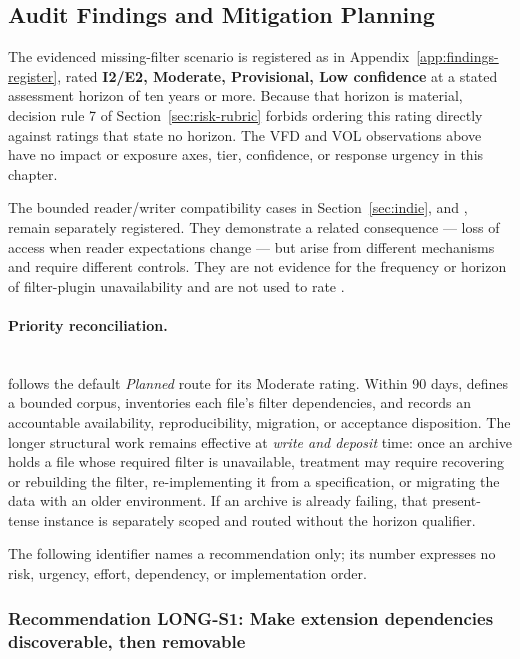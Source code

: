 \documentclass[../main.tex]{subfiles}
\begin{document}
\subsection{Audit Findings and Mitigation Planning}

The evidenced missing-filter scenario is registered as  in
Appendix~\ref{app:findings-register}, rated \textbf{I2/E2, Moderate,
Provisional, Low confidence} at a stated assessment horizon of
ten years or more. Because that horizon is material, decision rule 7 of
Section~\ref{sec:risk-rubric} forbids ordering this rating directly against
ratings that state no horizon. The VFD and VOL observations above have no
impact or exposure axes, tier, confidence, or response urgency in this chapter.

The bounded reader/writer compatibility cases in Section~\ref{sec:indie},
 and , remain separately registered. They
demonstrate a related consequence --- loss of access when reader expectations
change --- but arise from different mechanisms and require different controls.
They are not evidence for the frequency or horizon of filter-plugin
unavailability and are not used to rate .

\paragraph{Priority reconciliation.}\mbox{}\\
 follows the default \emph{Planned} route for its Moderate
rating. Within 90 days,  defines a bounded corpus, inventories each
file's filter dependencies, and records an accountable availability,
reproducibility, migration, or acceptance disposition. The longer structural
work remains effective at \emph{write and deposit} time: once an archive holds
a file whose required filter is unavailable, treatment may require recovering
or rebuilding the filter, re-implementing it from a specification, or migrating
the data with an older environment. If an archive is already failing, that
present-tense instance is separately scoped and routed without the horizon
qualifier.

The following identifier names a recommendation only; its number expresses no
risk, urgency, effort, dependency, or implementation order.

\subsubsection*{Recommendation LONG-S1: Make extension dependencies discoverable, then removable}
\end{document}
